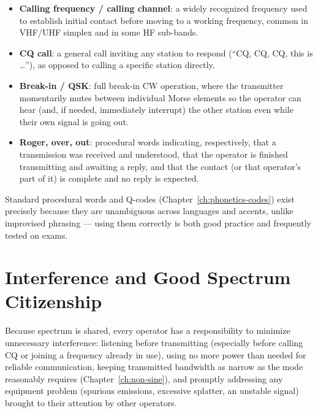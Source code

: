 \begin{itemize}
\item \textbf{Calling frequency / calling channel}: a widely recognized
frequency used to establish initial contact before moving to a working
frequency, common in VHF/UHF simplex and in some HF sub-bands.
\item \textbf{CQ call}: a general call inviting any station to respond
(``CQ, CQ, CQ, this is \dots''), as opposed to calling a specific
station directly.
\item \textbf{Break-in / QSK}: full break-in CW operation, where the
transmitter momentarily mutes between individual Morse elements so the
operator can hear (and, if needed, immediately interrupt) the other
station even while their own signal is going out.
\item \textbf{Roger, over, out}: procedural words indicating,
respectively, that a transmission was received and understood, that the
operator is finished transmitting and awaiting a reply, and that the
contact (or that operator's part of it) is complete and no reply is
expected.
\end{itemize}

\begin{examtip}
Standard procedural words and Q-codes (Chapter~\ref{ch:phonetics-codes})
exist precisely because they are unambiguous across languages and
accents, unlike improvised phrasing --- using them correctly is both
good practice and frequently tested on exams.
\end{examtip}

\section{Interference and Good Spectrum Citizenship}

Because spectrum is shared, every operator has a responsibility to
minimize unnecessary interference: listening before transmitting
(especially before calling CQ or joining a frequency already in use),
using no more power than needed for reliable communication, keeping
transmitted bandwidth as narrow as the mode reasonably requires
(Chapter~\ref{ch:non-sine}), and promptly addressing any equipment
problem (spurious emissions, excessive splatter, an unstable signal)
brought to their attention by other operators.

